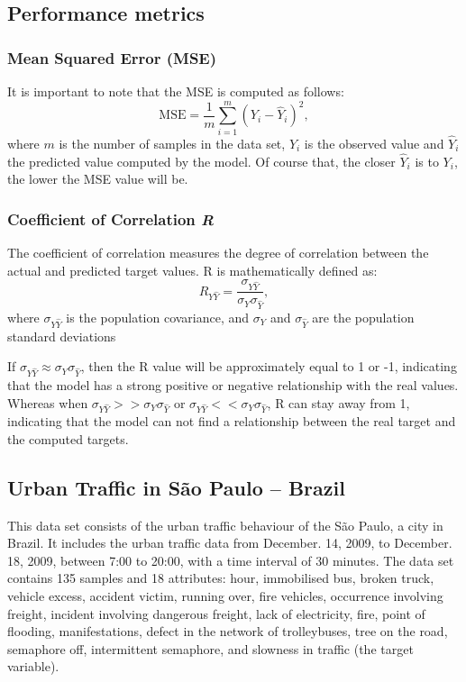 \subsection{Performance metrics}

\subsubsection{Mean Squared Error (MSE)}

It is important to note that the MSE is computed as follows: 
\begin{equation}
    \text{MSE} = \dfrac{1}{m}\sum_{i=1}^{m}(Y_i - \hat{Y}_i)^2,
\end{equation}
where $m$ is the number of samples in the data set, $Y_i$ is the observed value and $\hat{Y}_i$ the predicted value computed by the model. Of course that, the closer $\hat{Y}_i$ is to $Y_i$, the lower the MSE value will be. 

\subsubsection{Coefficient of Correlation \textit{R}}

The coefficient of correlation measures the degree of correlation between the actual and predicted target values. R is mathematically defined as:
\begin{equation}
    R_{Y\hat{Y}} = \dfrac{\sigma_{Y\hat{Y}}}{\sigma_{Y} \sigma_{\hat{Y}}},
\end{equation}
where $\sigma_{Y\hat{Y}}$ is the population covariance, and $\sigma_{Y}$ and $\sigma_{\hat{Y}}$ are the population standard deviations

If $\sigma_{Y\hat{Y}} \approx \sigma_{Y} \sigma_{\hat{Y}}$, then the R value will be approximately equal to 1 or -1, indicating that the model has a strong positive or negative relationship with the real values. Whereas when $\sigma_{Y\hat{Y}} >> \sigma_{Y} \sigma_{\hat{Y}}$ or $\sigma_{Y\hat{Y}} << \sigma_{Y} \sigma_{\hat{Y}}$, R can stay away from 1, indicating that the model can not find a relationship between the real target and the computed targets. 

\subsection{Urban Traffic in São Paulo -- Brazil}

This data set consists of the urban traffic behaviour of the São Paulo, a city in Brazil. It includes the urban traffic data from December. 14, 2009, to December. 18, 2009, between 7:00 to 20:00, with a time interval of 30 minutes. The data set contains 135 samples and 18 attributes: hour, immobilised bus, broken truck, vehicle excess, accident victim, running over, fire vehicles, occurrence involving freight, incident involving dangerous freight, lack of electricity, fire, point of flooding, manifestations, defect in the network of trolleybuses, tree on the road, semaphore off, intermittent semaphore, and slowness in traffic (the target variable). 

